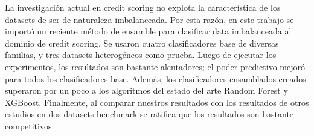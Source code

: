 \begin{resumen}
La investigación actual en credit scoring no explota la característica de los datasets de ser de naturaleza imbalanceada. Por esta razón, en este trabajo se importó un reciente método de ensamble para clasificar data imbalanceada al dominio de credit scoring. Se usaron cuatro clasificadores base de diversas familias, y tres datasets heterogéneos como prueba. Luego de ejecutar los experimentos, los resultados son bastante alentadores; el poder predictivo mejoró para todos los clasificadores base. Además, los clasificadores ensamblados creados superaron por un poco a los algoritmos del estado del arte Random Forest y XGBoost. Finalmente, al comparar nuestros resultados con los resultados de otros estudios en dos datasets benchmark se ratifica que los resultados son bastante competitivos.
\end{resumen}
